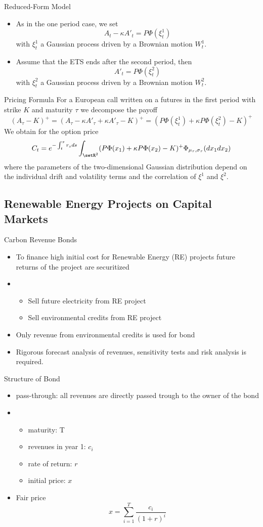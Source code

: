 {Reduced-Form Model}
\begin{itemize}
\item<1-> As in the one period case,  we set
$$
A_t-\kappa A'_t = P \Phi(\xi_t^1)
$$
with $\xi^1_t$ a Gaussian process driven by a Brownian motion $W^1_t$.
\item<2-> Assume that the ETS ends after the second period, then
$$
A'_t = P \Phi(\xi^2_t)
$$
with $\xi^2_t$ a Gaussian process driven by a Brownian motion $W^2_t$.
\end{itemize}

{Pricing Formula}
For a European call written on a futures in the first period with strike $K$ and maturity $\tau$ we decompose the payoff
$$
(A_\tau-K)^+= (A_\tau - \kappa A'_\tau + \kappa A'_\tau -K )^+= (P\Phi(\xi^1_t) + \kappa P \Phi(\xi_t^2) -K)^+
$$
We obtain for the option price
$$
C_t = e^{-\int_t^\tau r_s ds} \int_{\setR^2} (P\Phi(x_1)+\kappa P \Phi(x_2) -K)^+ \Phi_{\mu_\tau, \sigma_\tau}(dx_1dx_2)
$$
where the parameters of the two-dimensional Gaussian distribution depend on the individual drift and volatility terms and the correlation
of $\xi^1$ and $\xi^2$.

\subsection{Renewable Energy Projects on Capital Markets}

{Carbon Revenue Bonds}
\begin{itemize}
\item<1-> To finance high initial cost for Renewable Energy (RE) projects future returns of the project are securitized
\item<2->
\begin{itemize}
\item Sell future electricity from RE project
\item Sell environmental credits from RE project
\end{itemize}
\item<3-> Only revenue from environmental credits is used for bond
\item<4-> Rigorous forecast analysis of revenues, sensitivity tests and risk analysis is required.
\end{itemize}

{Structure of Bond}
\begin{itemize}
\item<1-> pass-through: all revenues are directly passed trough to the owner of the bond
\item<2->
\begin{itemize}
\item maturity: T
\item revenues in year 1: $c_i$
\item rate of return: $r$
\item initial price: $x$
\end{itemize}
\item<3-> Fair price
$$
x= \sum_{i=1}^T \frac{c_i}{(1+r)^i}
$$
\end{itemize}

